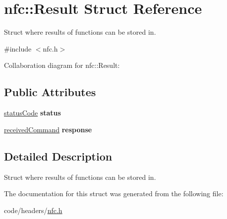 \hypertarget{structnfc_1_1Result}{}\section{nfc\+:\+:Result Struct Reference}
\label{structnfc_1_1Result}


Struct where results of functions can be stored in.  




{\ttfamily \#include $<$nfc.\+h$>$}



Collaboration diagram for nfc\+:\+:Result\+:
\subsection*{Public Attributes}
\begin{DoxyCompactItemize}
\item 
\mbox{\label{structnfc_1_1Result_a8d150a810d68d7a2de594d149f279711}} 
\hyperlink{declarations_8h_ae1d20c5a38cae82ccaa6a77be3fd264b}{status\+Code} {\bfseries status}
\item 
\mbox{\label{structnfc_1_1Result_a31e3829c8d169280747b08b9b67cc178}} 
\hyperlink{classreceivedCommand}{received\+Command} {\bfseries response}
\end{DoxyCompactItemize}


\subsection{Detailed Description}
Struct where results of functions can be stored in. 

The documentation for this struct was generated from the following file\+:\begin{DoxyCompactItemize}
\item 
code/headers/\hyperlink{nfc_8h}{nfc.\+h}\end{DoxyCompactItemize}
